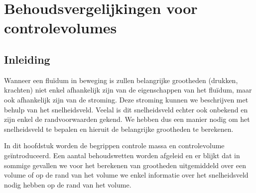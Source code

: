 \chapter{Behoudsvergelijkingen voor controlevolumes}
\label{sec:Behoudsvergelijkingen voor controlevolumes}

	\section{Inleiding}
	\label{sec:Controlevolume benadering Inleiding}
Wanneer een fluïdum in beweging is zullen belangrijke grootheden (drukken, krachten) niet enkel afhankelijk zijn van de eigenschappen van het fluïdum, maar ook afhankelijk zijn van de stroming. Deze stroming kunnen we beschrijven met behulp van het snelheidsveld. Veelal is dit snelheidsveld echter ook onbekend en zijn enkel de randvoorwaarden gekend. We hebben dus een manier nodig om het snelheidsveld te bepalen en hieruit de belangrijke grootheden te berekenen.

In dit hoofdstuk worden de begrippen controle massa en controlevolume geïntroduceerd. Een aantal behoudswetten worden afgeleid en er blijkt dat in sommige gevallen we voor het berekenen van grootheden uitgemiddeld over een volume of op de rand van het volume we enkel informatie over het snelheidsveld nodig hebben op de rand van het volume.

